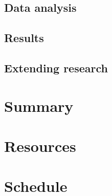 \documentclass[a4paper,10pt]{article}
\begin{document}
\subsection{Data analysis}


\subsection{Results}


\subsection{Extending research}



\section{Summary}


\section{Resources}


\section{Schedule}

\end{document}
